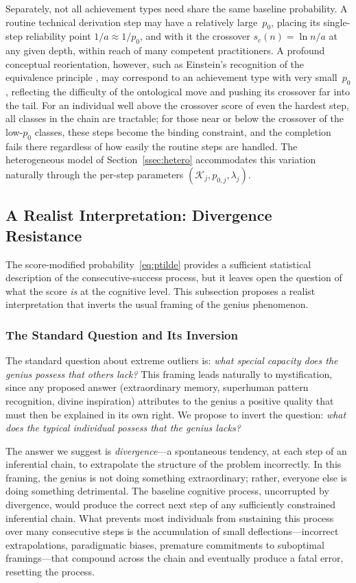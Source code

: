 \documentclass{article}
\begin{document}
Separately, not all achievement types need share the same baseline
probability. A routine technical derivation step may have a relatively
large~$p_0$, placing its single-step reliability point $1/a \approx 1/p_0$, and with it the crossover $s_c(n) = \ln n/a$ at any given depth, within reach
of many competent practitioners. A profound conceptual reorientation,
however, such as Einstein's recognition of the equivalence principle
\cite{pais1982subtle}, may correspond to an achievement type with very
small~$p_0$, reflecting the difficulty of the ontological move and
pushing its crossover far into the tail. For an individual well above the
crossover score of even the hardest step, all classes in the chain
are tractable; for those near or below the crossover of the low-$p_0$ classes,
these steps become the binding constraint, and the completion fails
there regardless of how easily the routine steps are handled.
The heterogeneous model of Section~\ref{ssec:hetero}
accommodates this variation naturally through the per-step
parameters $(\mathcal{K}_j, p_{0,j}, \lambda_j)$.

\subsection{A Realist Interpretation: Divergence Resistance}\label{ssec:divergence}

The score-modified probability~\eqref{eq:ptilde} provides a sufficient statistical description of the consecutive-success process, but it leaves open the question of what the score \emph{is} at the cognitive level. This subsection proposes a realist interpretation that inverts the usual framing of the genius phenomenon.

\subsubsection{The Standard Question and Its Inversion}

The standard question about extreme outliers is: \emph{what special capacity does the genius possess that others lack?} This framing leads naturally to mystification, since any proposed answer (extraordinary memory, superhuman pattern recognition, divine inspiration) attributes to the genius a positive quality that must then be explained in its own right. We propose to invert the question: \emph{what does the typical individual possess that the genius lacks?}

The answer we suggest is \emph{divergence}---a spontaneous tendency, at each step of an inferential chain, to extrapolate the structure of the problem incorrectly. In this framing, the genius is not doing something extraordinary; rather, everyone else is doing something detrimental. The baseline cognitive process, uncorrupted by divergence, would produce the correct next step of any sufficiently constrained inferential chain. What prevents most individuals from sustaining this process over many consecutive steps is the accumulation of small deflections---incorrect extrapolations, paradigmatic biases, premature commitments to suboptimal framings---that compound across the chain and eventually produce a fatal error, resetting the process.
\end{document}
